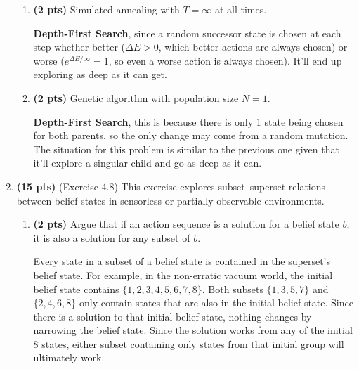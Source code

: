 \documentclass{article}
\begin{document}
\begin{enumerate}
\begin{enumerate}[label=($\alph*$)]
    \item \textbf{(2 pts)} Simulated annealing with $T = \infty$ at all times.

    \color{blue}
        \textbf{Depth-First Search}, since a random successor state is chosen at each step whether better ($\Delta E > 0$, which better actions are always chosen) or worse ($e^{\Delta E / \infty} = 1$, so even a worse action is always chosen). It'll end up exploring as deep as it can get.
    \color{black}


    \item \textbf{(2 pts)} Genetic algorithm with population size $N = 1$.

    \color{blue}
        \textbf{Depth-First Search}, this is because there is only 1 state being chosen for both parents, so the only change may come from a random mutation. The situation for this problem is similar to the previous one given that it'll explore a singular child and go as deep as it can.
    \color{black}

    
    \end{enumerate}



\item \textbf{(15 pts)} (Exercise 4.8) This exercise explores subset–superset relations between belief states in sensorless or partially observable environments.

\begin{enumerate}[label=($\alph*$)]
    
    
    \item \textbf{(2 pts)} Argue that if an action sequence is a solution for a belief state $b$, it is also a solution for any subset of $b$.

    \color{blue}
        Every state in a subset of a belief state is contained in the superset's belief state. For example, in the non-erratic vacuum world, the initial belief state contains $\{1, 2, 3, 4, 5, 6, 7, 8\}$. Both subsets $\{1, 3, 5, 7\}$ and $\{2, 4, 6, 8\}$ only contain states that are also in the initial belief state. Since there is a solution to that initial belief state, nothing changes by narrowing the belief state. Since the solution works from any of the initial 8 states, either subset containing only states from that initial group will ultimately work.
    \color{black}


\end{enumerate}
\end{enumerate}
\end{document}
